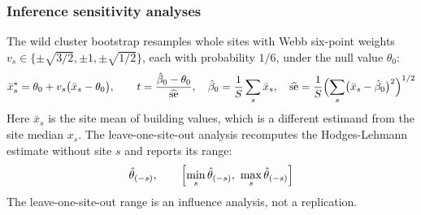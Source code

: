 \subsubsection*{Inference sensitivity analyses}
The wild cluster bootstrap resamples whole sites with Webb six-point weights $v_s\in\{\pm\sqrt{3/2},\pm1,\pm\sqrt{1/2}\}$, each with probability $1/6$, under the null value $\theta_0$:
\begin{equation}\label{eq:B12}
\bar{x}^{*}_{s}=\theta_{0}+v_{s}\bigl(\bar{x}_{s}-\theta_{0}\bigr),\qquad t=\frac{\hat\beta_{0}-\theta_{0}}{\widehat{\mathrm{se}}},\quad \hat\beta_{0}=\frac{1}{S}\sum_{s}\bar{x}_{s},\quad \widehat{\mathrm{se}}=\frac{1}{S}\Bigl(\sum_{s}\bigl(\bar{x}_{s}-\hat\beta_{0}\bigr)^{2}\Bigr)^{1/2}
\end{equation}
Here $\bar{x}_{s}$ is the site mean of building values, which is a different estimand from the site median $x_s$. The leave-one-site-out analysis recomputes the Hodges-Lehmann estimate without site $s$ and reports its range:
\begin{equation}\label{eq:B13}
\hat\theta_{(-s)},\qquad \Bigl[\min_{s}\hat\theta_{(-s)},\ \max_{s}\hat\theta_{(-s)}\Bigr]
\end{equation}
The leave-one-site-out range is an influence analysis, not a replication.
